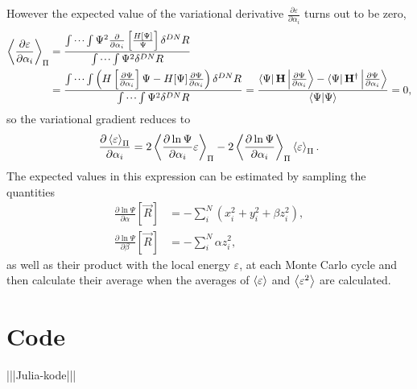 \documentclass[a4paper,8pt]{article}
\begin{document}
However the expected value of the variational derivative $\frac{\partial\varepsilon}{\partial\alpha_i}$ turns out to be zero,
\begin{align}
\ev{\frac{\partial\varepsilon}{\partial\alpha_i}}_\Pi &= \frac{\idotsint\Psi^2\frac{\partial}{\partial\alpha_i}\left[\frac{H[\Psi]}{\Psi}\right]\delta^{DN}R}{\idotsint \Psi^2 \delta^{DN}R} \nonumber\\
&= \frac{\idotsint\left(H\left[\frac{\partial\Psi}{\partial\alpha_i}\right]\Psi-H[\Psi]\frac{\partial\Psi}{\partial\alpha_i}\right)\delta^{DN}R}{\idotsint \Psi^2 \delta^{DN}R} = \frac{\bra{\Psi}\mathbf{H}\ket{\frac{\partial\Psi}{\partial\alpha_i}}-\bra{\Psi}\mathbf{H}^\dagger\ket{\frac{\partial\Psi}{\partial\alpha_i}}}{\braket{\Psi}{\Psi}} = 0,
\end{align}
so the variational gradient reduces to
\begin{equation}
\frac{\partial\ev{\varepsilon}_\Pi}{\partial\alpha_i} = 2\ev{\frac{\partial\ln\Psi}{\partial\alpha_i}\varepsilon}_\Pi-2\ev{\frac{\partial\ln\Psi}{\partial\alpha_i}}_\Pi\ev{\varepsilon}_\Pi.
\end{equation}
The expected values in this expression can be estimated by sampling the quantities
\begin{align}
\frac{\partial\ln\Psi}{\partial\alpha}[\vec{R}] &= -\sum\limits_i^N \left(x_i^2 + y_i^2 + \beta z_i^2\right), \\
\frac{\partial\ln\Psi}{\partial\beta}[\vec{R}] &= -\sum\limits_i^N \alpha z_i^2,
\end{align}
as well as their product with the local energy $\varepsilon$, at each Monte Carlo cycle and then calculate their average when the averages of $\ev{\varepsilon}$ and $\ev{\varepsilon^2}$ are calculated.


\newpage
\section{Code}

|||Julia-kode|||
\end{document}
